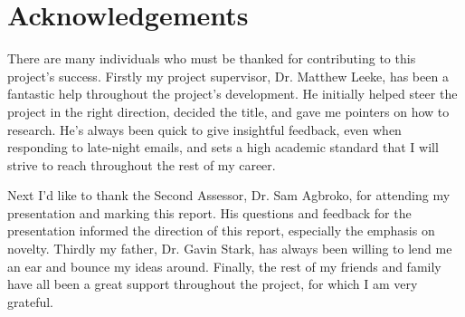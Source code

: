 \section*{Acknowledgements}

\vspace{2cm}

\large

There are many individuals who must be thanked for contributing to this project's success.
Firstly my project supervisor, Dr. Matthew Leeke, has been a fantastic help throughout the project's development.
He initially helped steer the project in the right direction, decided the title, and gave me pointers on how to research.
He's always been quick to give insightful feedback, even when responding to late-night emails, and sets a high academic standard that I will strive to reach throughout the rest of my career.

Next I'd like to thank the Second Assessor, Dr. Sam Agbroko, for attending my presentation and marking this report.
His questions and feedback for the presentation informed the direction of this report, especially the emphasis on novelty.
Thirdly my father, Dr. Gavin Stark, has always been willing to lend me an ear and bounce my ideas around.
Finally, the rest of my friends and family have all been a great support throughout the project, for which I am very grateful.
